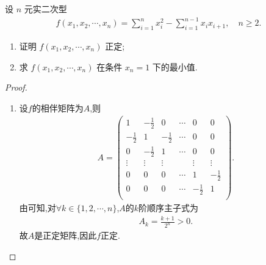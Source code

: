 \documentclass[../../main.tex]{subfiles}%
\begin{document}
\begin{example}
设 $n$ 元实二次型
\begin{align*}
f(x_1,x_2,\cdots,x_n) = \sum\limits_{i=1}^{n} x_i^2 - \sum\limits_{i=1}^{n-1} x_i x_{i+1},\quad n\geqslant 2.
\end{align*}
\begin{enumerate}[(1)]
\item 证明 $f(x_1,x_2,\cdots,x_n)$ 正定;
\item 求 $f(x_1,x_2,\cdots,x_n)$ 在条件 $x_n=1$ 下的最小值.
\end{enumerate}
\end{example}
\begin{proof}
\begin{enumerate}[(1)]
\item 设$f$的相伴矩阵为$A$,则
\begin{align*}
A = \left( \begin{matrix}
	1&		-\frac{1}{2}&		0&		\cdots&		0&		0\\
	-\frac{1}{2}&		1&		-\frac{1}{2}&		\cdots&		0&		0\\
	0&		-\frac{1}{2}&		1&		\cdots&		0&		0\\
	\vdots&		\vdots&		\vdots&		&		\vdots&		\vdots\\
	0&		0&		0&		\cdots&		1&		-\frac{1}{2}\\
	0&		0&		0&		\cdots&		-\frac{1}{2}&		1\\
\end{matrix} \right) .
\end{align*}
由可知,对$\forall k\in \{1,2,\cdots,n\}$,$A$的$k$阶顺序主子式为
\begin{align*}
A_k = \frac{k+1}{2^n}>0.
\end{align*}
故$A$是正定矩阵,因此$f$正定.


\end{enumerate}
\end{proof}
\end{document}
